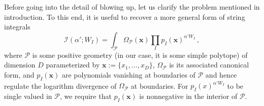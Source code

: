 \documentclass[12pt]{article}
\theoremstyle{definition}
\theoremstyle{plain}
\begin{document}
% 


Before going into the detail of blowing up, let us clarify the problem mentioned in introduction. To this end, it is useful to recover a more general form of string integrals
\begin{equation*}
  \mathcal{I}(\alpha';W_{I})=\int_{\mathcal{P}} \Omega_{\mathcal{P}}(\mathbf{x}) \prod_{I}p_{I}(\mathbf{x})^{\alpha'W_{I}}\,,
\end{equation*}
where $\mathcal{P}$ is some positive geometry (in our case, it is some simple polytope) of dimension $D$ parameterized by $\mathbf{x}:= \{x_{1},\ldots,x_{D}\}$, $\Omega_{\mathcal{P}}$ is its associated canonical form, and $p_{I}(\mathbf{x})$ are polynomials vanishing at boundaries of $\mathcal{P}$ and hence regulate the logarithm divergence of $\Omega_{\mathcal{P}}$ at boundaries. For $p_{I}(x)^{\alpha' W_{I}}$ to be single valued in $\mathcal{P}$, we require that $p_{I}(\mathbf{x})$ is nonnegative in the interior of $\mathcal{P}$. %
\end{document}
